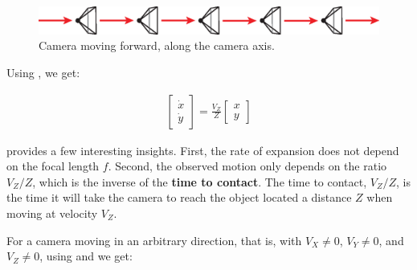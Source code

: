 \begin{figure}[h!]
    \centerline{
        \includegraphics[width=1\linewidth]{figures/optical_flow/camera_forward_translation.eps}
    }
    \caption{Camera moving forward, along the camera axis.}
    \label{fig:camera_forward_translation}
\end{figure}

Using \eqn{\ref{eq:forward_objects}}, we get:

\begin{align}
    \begin{bmatrix}
        \dot{x} \\
        \dot{y}
    \end{bmatrix}
    =
    \frac{V_Z}{Z}
    \begin{bmatrix}
        x \\
        y
    \end{bmatrix}
    \label{eq:motion_projection_focus_expansion}
\end{align}



\Eqn{\ref{eq:motion_projection_focus_expansion}} provides a few interesting insights. First, the rate of expansion does not depend on the focal length $f$. Second, the observed motion only depends on the ratio $V_Z/Z$, which is the inverse of the {\bf time to contact}.
The time to contact, $V_Z/Z$, is the time it will take the camera to reach the object located a distance $Z$ when moving at velocity $V_Z$.


For a camera moving in an arbitrary direction, that is, with $V_X \neq 0$, $V_Y \neq 0$, and $V_Z \neq 0$,  using \eqn{\ref{eq:motionprojection}} and \eqn{\ref{eq:motionvanishingpoint}} we get:


